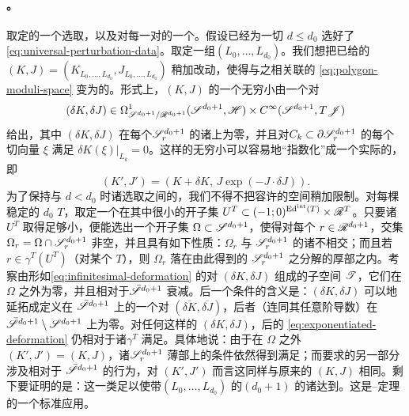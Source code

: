 \paragraph{\trTransversality。}\label{sub:transversality}
取定\trStriplikeEnd{}的一个\trConsistent\trUniversal{}选取，以及对每一对\trExact\trLagrange\trSubmanifold{}的一个\trFloerDatum。假设已经为一切 $d\le d_0$ 选好了\trPerturbationDatum{} \eqref{eq:universal-perturbation-data}。取定一组\trLagrange\trLabel{}$(L_0,\ldots,L_{d_0})$。我们想把已给的\trPerturbationDatum{}$(K,J)=(K_{L_0,\ldots,L_{d_0}},J_{L_0,\ldots,L_{d_0}})$ 稍加改动，使得与之相关联的\trModuliSpace{} \eqref{eq:polygon-moduli-space} 变为\trRegular{}的。形式上，$(K,J)$ 的一个无穷小\trDeformation{}由一个对
\begin{equation}\label{eq:infinitesimal-deformation}
(\delta K,\delta J)\in\Omega^1_{\mathscr{S}^{d_0+1}/\mathscr{R}^{d_0+1}}(\mathscr{S}^{d_0+1},\mathscr{H})\times C^\infty(\mathscr{S}^{d_0+1},T\mathscr{J})
\end{equation}
给出，其中 $(\delta K,\delta J)$ 在每个\trSurface{}$\mathscr{S}^{d_0+1}_r$ 的诸\trStriplikeEnd{}上为零，并且对\trConnectedComponent{}$C_k\subset\partial\mathscr{S}^{d_0+1}_r$ 的每个切向量 $\xi$ 满足 $\delta K(\xi)|_{L_k}=0$。这样的无穷小\trDeformation{}可以容易地“指数化”成一个实际的\trDeformation，即
\begin{equation}\label{eq:exponentiated-deformation}
(K',J')=(K+\delta K,\,J\exp(-J\cdot\delta J)).
\end{equation}
为了保持与 $d<d_0$ 时诸\trPerturbationDatum{}选取之间的\trConsistency，我们不得不把容许\trDeformation{}的空间稍加限制。对每棵稳定的 $d_0$ \trLeafedTree{}$T$，取定一个\trGluingParameter{}在其中很小的开子集 $U^T\subset(-1;0)^{\mathrm{Ed}^{\mathrm{int}}(T)}\times\mathscr{R}^T$。只要诸 $U^T$ 取得足够小，便能选出一个开子集 $\Omega\subset\mathscr{S}^{d_0+1}$，使得对每个 $r\in\mathscr{R}^{d_0+1}$，交集 $\Omega_r=\Omega\cap\mathscr{S}^{d_0+1}_r$ 非空，并且具有如下性质：$\Omega_r$ 与 $\mathscr{S}^{d_0+1}_r$ 的诸\trStriplikeEnd{}不相交；而且若 $r\in\gamma^T(U^T)$（对某个 $T$），则 $\Omega_r$ 落在由此得到的 $\mathscr{S}^{d_0+1}_r$ 之分解的厚部之内。考察由形如\eqref{eq:infinitesimal-deformation} 的对 $(\delta K,\delta J)$ 组成的子空间 $\mathscr{T}$，它们在 $\Omega$ 之外为零，并且相对于\trPartialCompactification{}$\bar{\mathscr{S}}^{d_0+1}$ \trAsymptotic{}衰减。后一个条件的含义是：$(\delta K,\delta J)$ 可以\trSmooth{}地延拓成定义在 $\bar{\mathscr{S}}^{d_0+1}$ 上的一个对 $(\overline{\delta K},\overline{\delta J})$，后者（连同其任意阶导数）在 $\bar{\mathscr{S}}^{d_0+1}\setminus\mathscr{S}^{d_0+1}$ 上为零。对任何这样的 $(\delta K,\delta J)$，\trDeformation{}后的\trPerturbationDatum{} \eqref{eq:exponentiated-deformation} 仍相对于诸\trGluingMap{}$\gamma^T$ 满足\trConsistency。具体地说：由于在 $\Omega$ 之外 $(K',J')=(K,J)$，诸\trSurface{}$\mathscr{S}^{d_0+1}_r$ 薄部上的条件依然得到满足；而\trConsistency{}要求的另一部分涉及相对于 $\bar{\mathscr{S}}^{d_0+1}$ 的\trAsymptotic{}行为，对 $(K',J')$ 而言这同样与原来的 $(K,J)$ 相同。剩下要证明的是：这一类\trDeformation{}足以使带\trLabel{}$(L_0,\ldots,L_{d_0})$ 的\trInhomogeneous\trPseudoholomorphic{}$(d_0{+}1)$ \trPolygon{}的诸\trModuliSpace{}达到\trRegularity。这是\trSard--\trSmale{}定理的一个标准应用。
